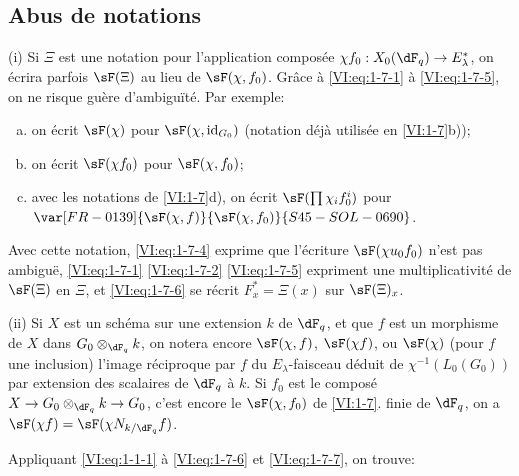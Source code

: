 \subsection{Abus de notations}\label{VI:1-8}

(i) Si $\Xi$ est une notation pour l'application composée 
$\chi f_0:X_0(\dF_q) \to E_\lambda^\ast$, on écrira parfois $\sF(\Xi)$ au 
lieu de $\sF(\chi,f_0)$. Grâce à \eqref{VI:eq:1-7-1} à \eqref{VI:eq:1-7-5}, 
on ne risque guère d'ambiguïté. Par exemple:
\begin{enumerate}[a)]
  \item on écrit $\sF(\chi)$ pour $\sF(\chi,\operatorname{id}_{G_0})$ 
    (notation déjà utilisée en \ref{VI:1-7}b)); 
  \item on écrit $\sF(\chi f_0)$ pour $\sF(\chi,f_0)$;
  \item avec les notations de \ref{VI:1-7}d), on écrit 
    $\sF(\prod \chi_i f_0^i)$ pour $\var[FR-0139]{\sF(\chi,f)}{\sF(\chi,f_0)}{S45-SOL-0690}$. 
\end{enumerate}

Avec cette notation, \eqref{VI:eq:1-7-4} exprime que l'écriture 
$\sF(\chi u_0 f_0)$ n'est pas ambiguë, \eqref{VI:eq:1-7-1} \eqref{VI:eq:1-7-2} 
\eqref{VI:eq:1-7-5} expriment une multiplicativité de $\sF(\Xi)$ en $\Xi$, 
et \eqref{VI:eq:1-7-6} se récrit $F_x^\ast = \Xi(x)$ sur $\sF(\Xi)_x$.

(ii) Si $X$ est un schéma sur une extension $k$ de $\dF_q$, et que $f$ est un 
morphisme de $X$ dans $G_0\otimes_{\dF_q} k$, on notera encore $\sF(\chi,f)$, 
$\sF(\chi f)$, ou $\sF(\chi)$ (pour $f$ une inclusion) l'image réciproque par 
$f$ du $E_\lambda$-faisceau déduit de $\chi^{-1}(L_0(G_0))$ par extension des 
scalaires de $\dF_q$ à $k$. Si $f_0$ est le composé 
$X\to G_0\otimes_{\dF_q} k \to G_0$, c'est encore le $\sF(\chi,f_0)$ de 
\ref{VI:1-7}.  finie de $\dF_q$, on a 
$\sF(\chi f) = \sF(\chi N_{k/\dF_q} f)$. 

Appliquant \eqref{VI:eq:1-1-1} à \eqref{VI:eq:1-7-6} et \eqref{VI:eq:1-7-7}, 
on trouve: 





